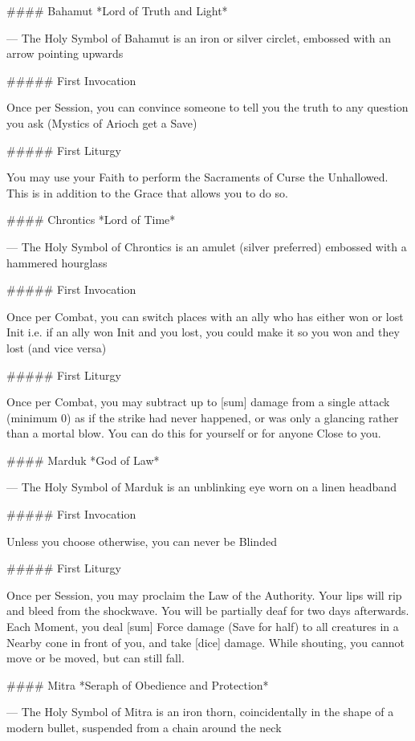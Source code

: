 #### Bahamut
*Lord of Truth and Light*

---
The Holy Symbol of Bahamut is an iron or silver circlet, embossed with an arrow pointing upwards

##### First Invocation

Once per Session, you can convince someone to tell you the truth to any question you ask (Mystics of Arioch get a Save)

##### First Liturgy

You may use your Faith to perform the Sacraments of Curse the Unhallowed.  This is in addition to the Grace that allows you to do so.




#### Chrontics
*Lord of Time*

---
The Holy Symbol of Chrontics is an amulet (silver preferred) embossed with a hammered hourglass

##### First Invocation

Once per Combat, you can switch places with an ally who has either won or lost Init i.e.  if an ally won Init and you lost, you could make it so you won and they lost (and vice versa)  

##### First Liturgy

Once per Combat, you may subtract up to [sum] damage from a single attack (minimum 0) as if the strike had never happened, or was only a glancing rather than a mortal blow.  You can do this for yourself or for anyone Close to you.




#### Marduk
*God of Law*

---
The Holy Symbol of Marduk is an unblinking eye worn on a linen headband

##### First Invocation

Unless you choose otherwise, you can never be Blinded

##### First Liturgy

Once per Session, you may proclaim the Law of the Authority.  Your lips will rip and bleed from the shockwave. You will be partially deaf for two days afterwards. Each Moment, you deal [sum] Force damage (Save for half) to all creatures in a Nearby cone in front of you, and take [dice] damage. While shouting, you cannot move or be moved, but can still fall.





#### Mitra
*Seraph of Obedience and Protection*

---
The Holy Symbol of Mitra is an iron thorn, coincidentally in the shape of a modern bullet, suspended from a chain around the neck

